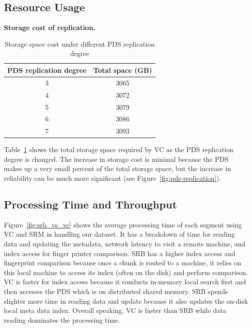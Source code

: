 \subsection{Resource Usage}
{\bf Storage cost of replication.}
\begin{table}
    \begin{tabular}{|c|c|}
    \hline
    PDS replication degree & Total space (GB) \\ \hline
    3                      & 3065             \\ \hline
    4                      & 3072             \\ \hline
    5                      & 3079             \\ \hline
    6                      & 3086             \\ \hline
    7                      & 3093             \\ \hline
    \end{tabular}
\caption{Storage space cost under different PDS replication degree}
\label{tab:replication_cost}
\end{table}

Table~\ref{tab:replication_cost} shows the total storage space required by VC as the PDS replication degree is changed. The increase in storage cost is minimal because the PDS makes up a very small percent of the total storage space, but the increase in reliability can be much more significant (see Figure~\ref{fig:pds-replication}).

\subsection{Processing Time and Throughput}

Figure~\ref{fig:srb_vs_vc} shows
the  average  processing  time of  each segment using VC and SRM in handling our dataset.
It has a breakdown of time for reading data and updating the metadata, network latency to visit
a remote machine, and index access for finger printer comparison.
SRB has a higher index access and fingerprint comparison because once a chunk is routed to a machine,
it relies on this local machine to access its index (often on the disk) and perform comparison.
VC is faster for index access because it conducts in-memory local search first and then
accesses  the PDS which is on distributed shared memory.  
SRB spends  slighter more time in  reading data and update because it also updates the on-disk
local meta data index.
Overall speaking,  VC is faster than SRB while data reading dominates the processing time. 


